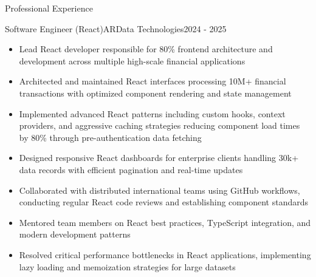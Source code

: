 \documentclass[]{mcdowellcv}
\begin{document}
	\begin{cvsection}{Professional Experience}
		\begin{cvsubsection}{Software Engineer (React)}{ARData Technologies}{2024 - 2025}		
			\begin{itemize}
        \item Lead React developer responsible for 80\% frontend architecture and development across multiple high-scale financial applications
        \item Architected and maintained React interfaces processing 10M+ financial transactions with optimized component rendering and state management
        \item Implemented advanced React patterns including custom hooks, context providers, and aggressive caching strategies reducing component load times by 80\% through pre-authentication data fetching
        \item Designed responsive React dashboards for enterprise clients handling 30k+ data records with efficient pagination and real-time updates
        \item Collaborated with distributed international teams using GitHub workflows, conducting regular React code reviews and establishing component standards
        \item Mentored team members on React best practices, TypeScript integration, and modern development patterns
        \item Resolved critical performance bottlenecks in React applications, implementing lazy loading and memoization strategies for large datasets
			\end{itemize}
		\end{cvsubsection}

		\pagebreak
		

\end{cvsection}
\end{document}
